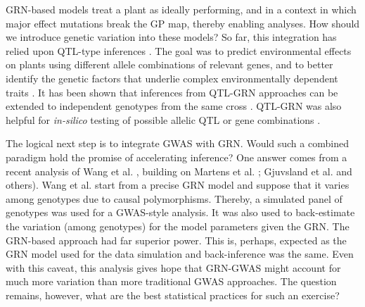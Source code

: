 GRN-based models treat a plant as ideally performing, and in a context in which major effect mutations break the GP map, thereby enabling analyses. How should we introduce genetic variation into these models? So far, this integration has relied upon QTL-type inferences \cite{Yin2003, Uptmoor2012}. The goal was to predict environmental effects on plants using different allele combinations of relevant genes, and to better identify the genetic factors that underlie complex environmentally dependent traits \cite{Reymond2003, Tardieu2003, Hammer2004, Quilot2005, Malosetti2006}. It has been shown that inferences from QTL-GRN approaches can be extended to independent genotypes from the same cross \cite{Reymond2003}. QTL-GRN was also helpful for \emph{in-silico} testing of possible allelic QTL or gene combinations \cite{Podlich1998}.

The logical next step is to integrate GWAS with GRN. Would such a combined paradigm hold the promise of accelerating inference? One answer comes from a recent analysis of Wang et al. \cite{Wang2012}, building on Martens et al. \cite{Martens2009}; Gjuvsland et al.\cite{Gjuvsland2010, Gjuvsland2011} and others). Wang et al. \cite{Wang2012} start from a precise GRN model and suppose that it varies among genotypes due to causal polymorphisms. Thereby, a simulated panel of genotypes was used for a GWAS-style analysis. It was also used to back-estimate the variation (among genotypes) for the model parameters given the GRN. The GRN-based approach had far superior power. This is, perhaps, expected as the GRN model used for the data simulation and back-inference was the same. Even with this caveat, this analysis gives hope that GRN-GWAS might account for much more variation than more traditional GWAS approaches. The question remains, however, what are the best statistical practices for such an exercise?

